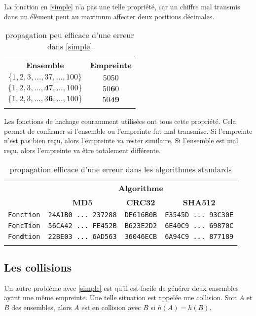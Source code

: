 \documentclass[11pt]{article}
\begin{document}
La fonction en \eqref{simple} n'a pas une telle propriété, car un chiffre mal transmis dans un élèment peut au maximum affecter deux positions décimales.
\begin{table}[H]
  \centering
  \caption{propagation peu efficace d'une erreur dans \eqref{simple}}
  \begin{tabular}{cc}
      \Xhline{2\arrayrulewidth}
      \textbf{Ensemble}
    & \textbf{Empreinte}\\
      \Xhline{2\arrayrulewidth}
      $\{1,2,3,...,37,...,100\}$
    & $5050$\\
      $\{1,2,3,...,\mathbf{4}7,...,100\}$
    & $50\mathbf{6}0$\\
      $\{1,2,3,...,3\mathbf{6},...,100\}$
    & $50\mathbf{49}$\\
      \Xhline{2\arrayrulewidth}
  \end{tabular}
\end{table}

Les fonctions de hachage couramment utilisées ont tous cette propriété. Cela permet de confirmer si l'ensemble ou l'empreinte fut mal transmise. Si l'empreinte n'est pas bien reçu, alors l'empreinte va rester similaire. Si l'ensemble est mal reçu, alors l'empreinte va être totalement différente.

\begin{table}[H]
  \centering
  \caption{propagation efficace d'une erreur dans les algorithmes standards}
  \begin{tabular}{lccc}
      \Xhline{2\arrayrulewidth}
      \multirow{2}{*}{\textbf{Message}}
    & \multicolumn{3}{c}{\textbf{Algorithme}}\\
      \cline{2-4}
    & \textbf{MD5}
    & \textbf{CRC32}
    & \textbf{SHA512}\\
      \Xhline{2\arrayrulewidth}
      \texttt{Fonction}
    & \texttt{24A1B0 ... 237288}
    & \texttt{DE616B0B}
    & \texttt{E3545D ... 93C30E}\\
      \texttt{Fonc\textbf{T}ion}
    & \texttt{56CA42 ... FE452B}
    & \texttt{B623E2D2}
    & \texttt{6E40C9 ... 69870C}\\
      \texttt{Fon\textbf{d}tion}
    & \texttt{22BE03 ... 6AD563}
    & \texttt{36046ECB}
    & \texttt{6A94C9 ... 877189}\\
      \Xhline{2\arrayrulewidth}
  \end{tabular}
\end{table}

\subsection{Les collisions}
Un autre problème avec \eqref{simple} est qu'il est facile de générer deux ensembles ayant une même empreinte. Une telle situation est appelée une collision. Soit $A$ et $B$ des ensembles, alors $A$ est en collision avec $B$ si $h(A)=h(B)$.
\end{document}
